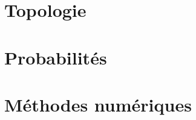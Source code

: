 \documentclass[a4paper, 11pt, twocolumn, oneside, openright]{report}
\theoremstyle{definition}
\begin{document}
\part{Topologie}


\part{Probabilités}




\part{Méthodes numériques}






\restoregeometry
\end{document}
